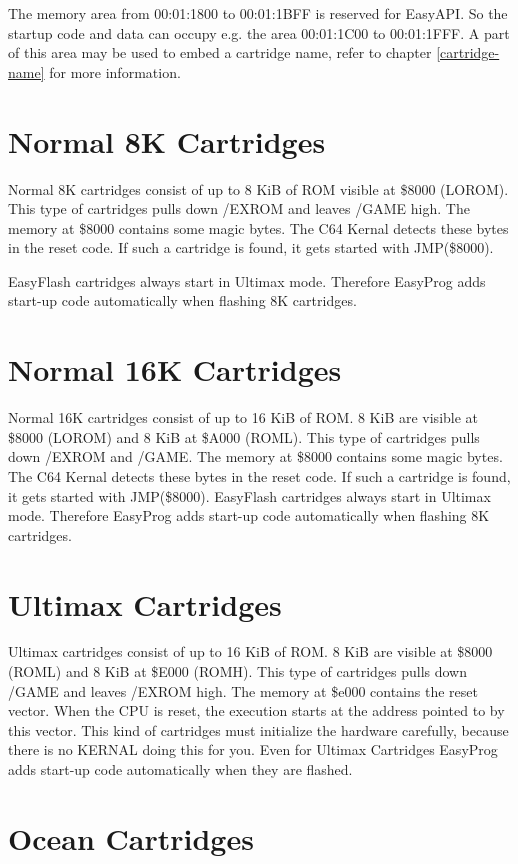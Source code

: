 \documentclass[a4paper,oneside]{memoir}
\begin{document}
The memory area from 00:01:1800 to 00:01:1BFF is reserved for EasyAPI. So the
startup code and data can occupy e.g. the area 00:01:1C00 to 00:01:1FFF. A part
of this area may be used to embed a cartridge name, refer to chapter
\ref{cartridge-name} for more information.

\section {Normal 8K Cartridges}

Normal 8K cartridges consist of up to 8 KiB of ROM visible at \$8000 (LOROM).
This type of cartridges pulls down /EXROM and leaves /GAME high.
The memory at \$8000 contains some magic bytes. The C64 Kernal detects these
bytes in the reset code. If such a cartridge is found, it gets started with
JMP(\$8000).

EasyFlash cartridges always start in Ultimax mode. Therefore EasyProg adds
start-up code automatically when flashing 8K cartridges.

\section{Normal 16K Cartridges}

Normal 16K cartridges consist of up to 16 KiB of ROM. 8 KiB are visible at
\$8000 (LOROM) and 8 KiB at \$A000 (ROML). This type of cartridges pulls down
/EXROM and /GAME.
The memory at \$8000 contains some magic bytes. The C64 Kernal detects these
bytes in the reset code. If such a cartridge is found, it gets started with
JMP(\$8000).
EasyFlash cartridges always start in Ultimax mode. Therefore EasyProg adds
start-up code automatically when flashing 8K cartridges.

\section{Ultimax Cartridges}

Ultimax cartridges consist of up to 16 KiB of ROM. 8 KiB are visible at \$8000
(ROML) and 8 KiB at \$E000 (ROMH). This type of cartridges pulls down /GAME and
leaves /EXROM high.
The memory at \$e000 contains the reset vector. When the CPU is reset, the
execution starts at the address pointed to by this vector. This kind of
cartridges must initialize the hardware carefully, because there is no KERNAL
doing this for you.
Even for Ultimax Cartridges EasyProg adds start-up code automatically when they
are flashed.

\section{Ocean Cartridges}
\end{document}
